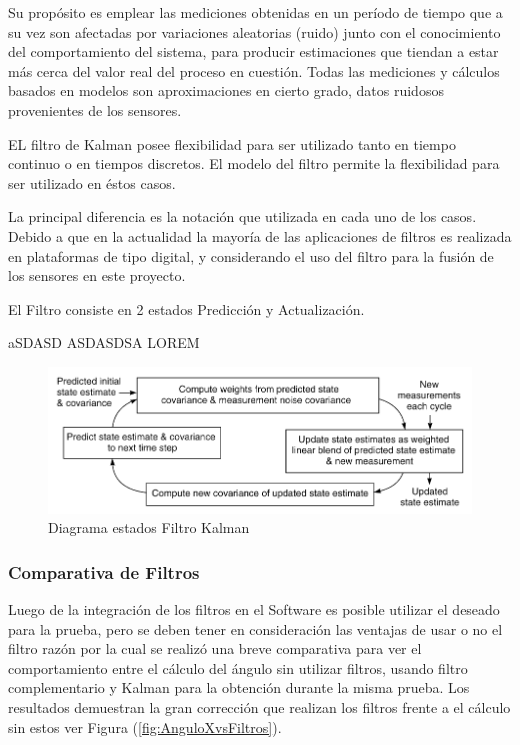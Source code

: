 \documentclass[12pt,a4paper]{article}
\begin{document}
Su propósito es emplear las mediciones obtenidas en un período de tiempo que a su vez son afectadas por variaciones  aleatorias (ruido) junto con el conocimiento del comportamiento del sistema, para producir estimaciones que tiendan a estar más cerca del valor real del proceso en cuestión. Todas las mediciones y cálculos basados en modelos son aproximaciones en cierto grado, datos ruidosos provenientes de los sensores. 

EL filtro de Kalman posee flexibilidad para ser utilizado tanto en tiempo continuo o en tiempos discretos. El modelo del filtro permite la flexibilidad para ser utilizado en éstos casos.

La principal diferencia es la notación que utilizada en cada uno de los casos.
Debido a que en la actualidad la mayoría de las aplicaciones de filtros es realizada en plataformas de tipo digital, y considerando el uso del filtro para la fusión de los sensores en este proyecto.

El Filtro consiste en 2 estados Predicción y Actualización.

aSDASD
ASDASDSA LOREM

\begin{figure}[H]
\centering
\includegraphics[scale=0.5]{images/kalman-filter.png} 
\caption{Diagrama estados Filtro Kalman}
\label{fig:diagramakalman}
\end{figure}


\subsubsection{Comparativa de Filtros}
Luego de la integración de los filtros en el Software es posible utilizar el deseado para la prueba, pero se deben tener en consideración las ventajas de usar o no el filtro razón por la cual se realizó una breve comparativa para ver el comportamiento entre el cálculo del ángulo sin utilizar filtros, usando filtro complementario y Kalman para la obtención durante la misma prueba.
Los resultados demuestran la gran corrección que realizan los filtros frente a el cálculo sin estos ver Figura (\ref{fig:AnguloXvsFiltros}).
\end{document}
